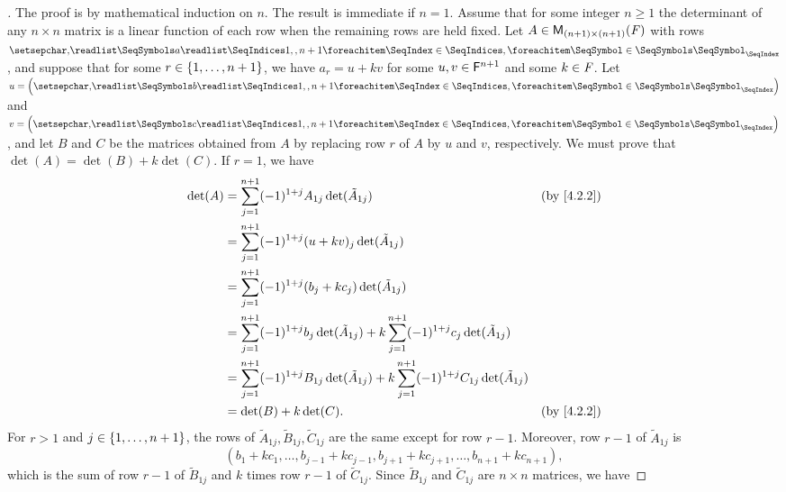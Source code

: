 \begin{proof}[]
	The proof is by mathematical induction on \(n\).
	The result is immediate if \(n = 1\).
	Assume that for some integer \(n \geq 1\) the determinant of any \(n \times n\) matrix is a linear function of each row when the remaining rows are held fixed.
	Let \(A \in \ms[(n + 1)][(n + 1)][\F]\) with rows \(\seq{a}{1,,n+1}\), and suppose that for some \(r \in \left\lbrace1, \dots, n + 1\right\rbrace\), we have \(a_r = u + kv\) for some \(u, v \in \mathsf{F}^{n + 1}\) and some \(k \in \mathit{F}\).
	Let \(u = \tuple{b}{1,,n+1}\) and \(v = \tuple{c}{1,,n+1}\), and let \(B\) and \(C\) be the matrices obtained from \(A\) by replacing row \(r\) of \(A\) by \(u\) and \(v\), respectively.
	We must prove that \(\det(A) = \det(B) + k \det(C)\).
	If \(r = 1\), we have
	\begin{align*}
		\det(A) & = \sum_{j = 1}^{n + 1} (-1)^{1 + j} A_{1 j} \det(\tilde{A}_{1 j})                                                                     &  & \by{4.2.2} \\
		        & = \sum_{j = 1}^{n + 1} (-1)^{1 + j} (u + kv)_j \det(\tilde{A}_{1 j})                                                                                  \\
		        & = \sum_{j = 1}^{n + 1} (-1)^{1 + j} (b_j + k c_j) \det(\tilde{A}_{1 j})                                                                               \\
		        & = \sum_{j = 1}^{n + 1} (-1)^{1 + j} b_j \det(\tilde{A}_{1 j}) + k \sum_{j = 1}^{n + 1} (-1)^{1 + j} c_j \det(\tilde{A}_{1 j})                         \\
		        & = \sum_{j = 1}^{n + 1} (-1)^{1 + j} B_{1 j} \det(\tilde{A}_{1 j}) + k \sum_{j = 1}^{n + 1} (-1)^{1 + j} C_{1 j} \det(\tilde{A}_{1 j})                 \\
		        & = \det(B) + k \det(C).                                                                                                                &  & \by{4.2.2}
	\end{align*}
	For \(r > 1\) and \(j \in \left\lbrace1, \dots, n + 1\right\rbrace\), the rows of \(\tilde{A}_{1 j}, \tilde{B}_{1 j}, \tilde{C}_{1 j}\) are the same except for row \(r - 1\).
	Moreover, row \(r - 1\) of \(\tilde{A}_{1 j}\) is
	\[
		(b_1 + k c_1, \dots, b_{j - 1} + k c_{j - 1}, b_{j + 1} + k c_{j + 1}, \dots, b_{n + 1} + k c_{n + 1}),
	\]
	which is the sum of row \(r - 1\) of \(\tilde{B}_{1 j}\) and \(k\) times row \(r - 1\) of \(\tilde{C}_{1 j}\).
	Since \(\tilde{B}_{1 j}\) and \(\tilde{C}_{1 j}\) are \(n \times n\) matrices, we have

\end{proof}
